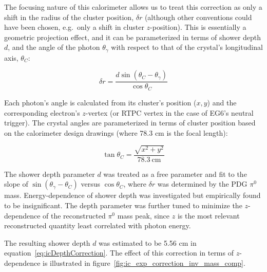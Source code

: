 The focusing nature of this calorimeter allows us to treat this correction as only a shift in the radius of the cluster position, $\delta r$ (although other conventions could have been chosen, e.g.~only a shift in cluster $z$-position).  This is essentially a geometric projection effect, and it can be parameterized in terms of shower depth $d$, and the angle of the photon $\theta_\gamma$ with respect to that of the crystal's longitudinal axis, $\theta_C$:

\begin{equation}
  \delta r = \frac{d\sin(\theta_C-\theta_\gamma)}{\cos\theta_C}
  \label{eq:icDepthCorrection}
\end{equation}

Each photon's angle is calculated from its cluster's position ($x,y$) and the corresponding electron's $z$-vertex (or RTPC vertex in the case of EG6's neutral trigger).  The crystal angles are parameterized in terms of cluster position based on the calorimeter design drawings (where 78.3 cm is the focal length):

\begin{equation}
  \tan\theta_C=\frac{\sqrt{x^2+y^2}}{78.3\ \mathrm{cm}}
  \label{eq:cystalAngles}
\end{equation}

The shower depth parameter $d$ was treated as a free parameter and fit to the slope of $\sin(\theta_\gamma-\theta_C)$ versus $\cos\theta_C$, where $\delta r$ was determined by the PDG $\pi^0$ mass.  Energy-dependence of shower depth was investigated but empirically found to be insignificant.  The depth parameter was further tuned to minimize the $z$-dependence of the reconstructed $\pi^0$ mass peak, since $z$ is the most relevant reconstructed quantity least correlated with photon energy.

The resulting shower depth $d$ was estimated to be 5.56 cm in equation~\ref{eq:icDepthCorrection}.  The effect of this correction in terms of $z$-dependence is illustrated in figure~\ref{fig:ic_exp_correction_inv_mass_comp}.

